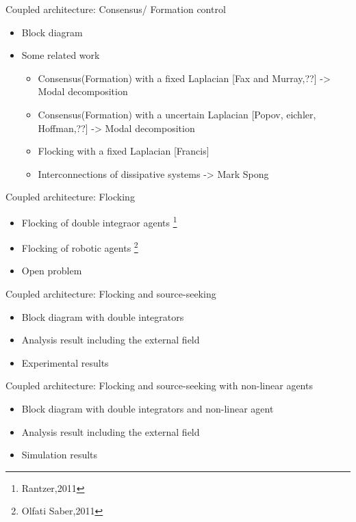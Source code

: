 \begin{frame}{Coupled architecture: Consensus/ Formation control}	
	\begin{itemize}
		\item Block diagram
		\item Some related work
		\begin{itemize}
			\item Consensus(Formation) with a fixed Laplacian [Fax and Murray,??] -> Modal decomposition
			\item Consensus(Formation) with a uncertain Laplacian [Popov, eichler, Hoffman,??] -> Modal decomposition
			\item Flocking with a fixed Laplacian [Francis]	
			\item Interconnections of dissipative systems -> Mark Spong		
		\end{itemize}
	\end{itemize}
\end{frame}
\begin{frame}{Coupled architecture: Flocking}	
	\begin{itemize}
		\item Flocking of double integraor agents \footnote{Rantzer,2011}
		\item Flocking of robotic agents \footnote{Olfati Saber,2011}
		\item Open problem
	\end{itemize}
\end{frame}
\begin{frame}{Coupled architecture: Flocking and source-seeking}	
	\begin{itemize}
		\item Block diagram with double integrators
		\item Analysis result including the external field
		\item Experimental results
	\end{itemize}
\end{frame}
\begin{frame}{Coupled architecture: Flocking and source-seeking with non-linear agents}	
	\begin{itemize}
		\item Block diagram with double integrators and non-linear agent
		\item Analysis result including the external field
		\item Simulation results
	\end{itemize}
\end{frame}
